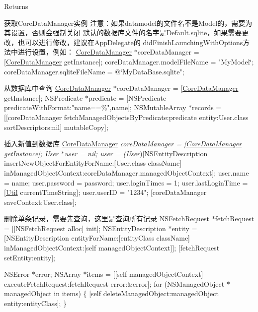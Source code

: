 \begin{DoxyReturn}{Returns}

\end{DoxyReturn}
获取\+Core\+Data\+Manager实例 注意：如果datamodel的文件名不是\+Model的，需要为其设置，否则会强制关闭 默认的数据库文件的名字是\+Default.\+sqlite，如果需要更改，也可以进行修改，建议在\+App\+Delegate的 did\+Finish\+Launching\+With\+Options方法中进行设置，例如： \hyperlink{interface_core_data_manager}{Core\+Data\+Manager} $\ast$core\+Data\+Manager = \mbox{[}\hyperlink{interface_core_data_manager}{Core\+Data\+Manager} get\+Instance\mbox{]}; core\+Data\+Manager.\+model\+File\+Name = "My\+Model\char`\"{};
core\+Data\+Manager.\+sqlite\+File\+Name = @\char`\"{}My\+Data\+Base.\+sqlite";

从数据库中查询 \hyperlink{interface_core_data_manager}{Core\+Data\+Manager} $\ast$core\+Data\+Manager = \mbox{[}\hyperlink{interface_core_data_manager}{Core\+Data\+Manager} get\+Instance\mbox{]}; N\+S\+Predicate $\ast$predicate = \mbox{[}N\+S\+Predicate predicate\+With\+Format\+:"name==\%",name\mbox{]}; N\+S\+Mutable\+Array $\ast$records = \mbox{[}\mbox{[}core\+Data\+Manager fetch\+Managed\+Objects\+By\+Predicate\+:predicate entity\+:User.\+class sort\+Descriptors\+:nil\mbox{]} mutable\+Copy\mbox{]};

插入新值到数据库 \hyperlink{interface_core_data_manager}{Core\+Data\+Manager} {\itshape core\+Data\+Manager = \mbox{[}\hyperlink{interface_core_data_manager}{Core\+Data\+Manager} get\+Instance\mbox{]}; User $\ast$user = nil; user = (User})\mbox{[}N\+S\+Entity\+Description insert\+New\+Object\+For\+Entity\+For\+Name\+:\mbox{[}User.\+class class\+Name\mbox{]} in\+Managed\+Object\+Context\+:core\+Data\+Manager.\+managed\+Object\+Context\mbox{]}; user.\+name = name; user.\+password = password; user.\+login\+Times = 1; user.\+last\+Login\+Time = \mbox{[}\hyperlink{interface_util}{Util} current\+Time\+String\mbox{]}; user.\+user\+I\+D = "1234"; \mbox{[}core\+Data\+Manager save\+Context\+:User.\+class\mbox{]};

删除单条记录，需要先查询，这里是查询所有记录 N\+S\+Fetch\+Request $\ast$fetch\+Request = \mbox{[}\mbox{[}N\+S\+Fetch\+Request alloc\mbox{]} init\mbox{]}; N\+S\+Entity\+Description $\ast$entity = \mbox{[}N\+S\+Entity\+Description entity\+For\+Name\+:\mbox{[}entity\+Class class\+Name\mbox{]} in\+Managed\+Object\+Context\+:\mbox{[}self managed\+Object\+Context\mbox{]}\mbox{]}; \mbox{[}fetch\+Request set\+Entity\+:entity\mbox{]};

N\+S\+Error $\ast$error; N\+S\+Array $\ast$items = \mbox{[}\mbox{[}self managed\+Object\+Context\mbox{]} execute\+Fetch\+Request\+:fetch\+Request error\+:\&error\mbox{]}; for (N\+S\+Managed\+Object $\ast$managed\+Object in items) \{ \mbox{[}self delete\+Managed\+Object\+:managed\+Object entity\+:entity\+Class\mbox{]}; \}

